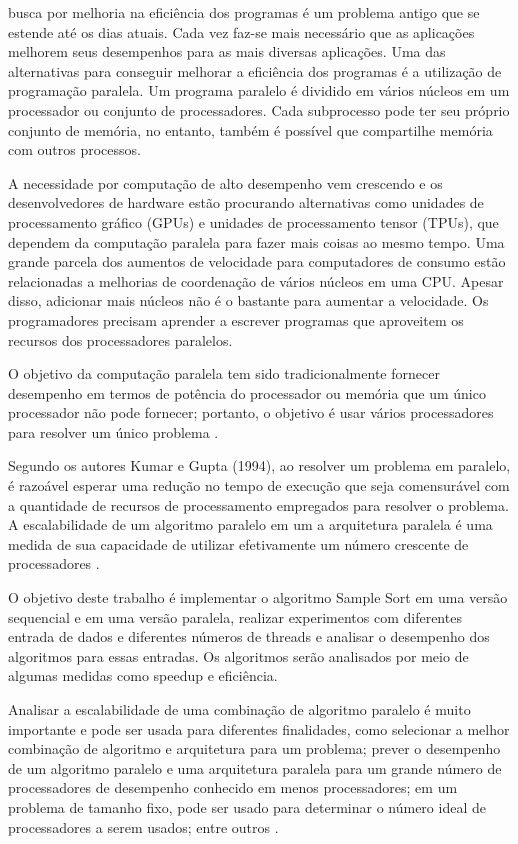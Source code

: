 \documentclass[journal]{IEEEtran}
\begin{document}
busca por melhoria na eficiência dos programas é um problema antigo que se estende até os dias atuais. Cada vez faz-se mais necessário que as aplicações melhorem seus desempenhos para as mais diversas aplicações. Uma das alternativas para conseguir melhorar a eficiência dos programas é a utilização de programação paralela. Um programa paralelo é dividido em vários núcleos em um processador ou conjunto de processadores. Cada subprocesso pode ter seu próprio conjunto de memória, no entanto, também é possível que compartilhe memória com outros processos. 

A necessidade por computação de alto desempenho vem crescendo e os desenvolvedores de hardware estão procurando alternativas como unidades de processamento gráfico (GPUs) e unidades de processamento tensor (TPUs), que dependem da computação paralela para fazer mais coisas ao mesmo tempo. Uma grande parcela dos aumentos de velocidade para computadores de consumo estão relacionadas a melhorias de coordenação de vários núcleos em uma CPU. Apesar disso, adicionar mais núcleos não é o bastante para aumentar a velocidade. Os programadores precisam aprender a escrever programas que aproveitem os recursos dos processadores paralelos.

O objetivo da computação paralela tem sido tradicionalmente fornecer desempenho em termos de potência do processador ou memória que um único processador não pode fornecer; portanto, o objetivo é usar vários processadores para resolver um único problema \cite{lin}.

Segundo os autores Kumar e Gupta (1994), ao resolver um problema em paralelo, é razoável esperar uma redução no tempo de execução que seja comensurável com a quantidade de recursos de processamento empregados para resolver o problema. A escalabilidade de um algoritmo paralelo em um a arquitetura paralela é uma medida de sua capacidade de utilizar efetivamente um número crescente de processadores \cite{Kumar}. 



O objetivo deste trabalho é implementar o algoritmo Sample Sort em uma versão sequencial e em uma versão paralela, realizar experimentos com diferentes entrada de dados e diferentes números de threads  e  analisar o desempenho dos algoritmos para essas entradas. Os algoritmos serão analisados por meio de algumas medidas como speedup e eficiência. 


Analisar a escalabilidade de uma combinação de algoritmo paralelo é muito importante e pode ser usada para diferentes finalidades, como selecionar a melhor combinação de algoritmo e arquitetura para um problema; prever o desempenho de um algoritmo paralelo e uma arquitetura paralela para um grande número de processadores de desempenho conhecido em menos processadores; em um problema de tamanho fixo, pode ser usado para determinar o número ideal de processadores a serem usados; entre outros \cite{Kumar}.
\end{document}
